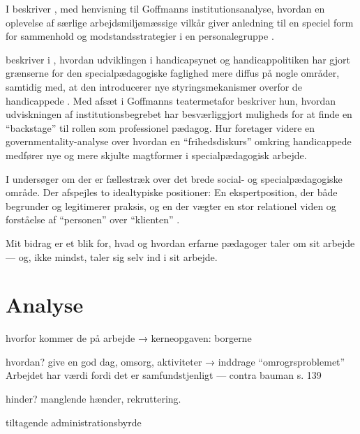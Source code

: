 I  beskriver \citeauthor{dreyerespersenBekymrendeIdentiteterAnbragte2010}, med henvisning til Goffmanns institutionsanalyse, hvordan en oplevelse af særlige arbejdsmiljømæssige vilkår giver anledning til en speciel form for sammenhold og modstandsstrategier i en personalegruppe \autocite{dreyerespersenBekymrendeIdentiteterAnbragte2010}.

\citeauthor{hurFrigorelsensMagt2015} beskriver i , hvordan udviklingen i handicapsynet og handicappolitiken har gjort grænserne for den specialpædagogiske faglighed mere diffus på nogle områder, samtidig med, at den introducerer nye styringsmekanismer overfor de handicappede \autocite{hurFrigorelsensMagt2015}.
Med afsæt i Goffmanns teatermetafor beskriver hun, hvordan udviskningen af institutionsbegrebet har besværliggjort muligheds for at finde en “backstage” til rollen som professionel pædagog.
Hur foretager videre en governmentality-analyse over hvordan en “frihedsdiskurs” omkring handicappede medfører nye og mere skjulte magtformer i specialpædagogisk arbejde.

I  undersøger \citeauthor{meyer-johansenFagligeOrienteringerSocialspecialpaedagogisk2018} om der er fællestræk over det brede social- og specialpædagogiske område.
Der afspejles to idealtypiske positioner: En ekspertposition, der både begrunder og legitimerer praksis, og en der vægter en stor relationel viden og forståelse af “personen” over “klienten” \autocite{meyer-johansenFagligeOrienteringerSocialspecialpaedagogisk2018}.

Mit bidrag er et blik for, hvad og hvordan erfarne pædagoger taler om sit arbejde — og, ikke mindst, taler sig selv ind i sit arbejde.

\section{Analyse}
hvorfor kommer de på arbejde → kerneopgaven: borgerne

hvordan? give en god dag, omsorg, aktiviteter → inddrage “omrogrsproblemet” \autocite[s.455ff]{hansbolKonstruktionAfProfessionel2008}
Arbejdet har værdi fordi det er samfundstjenligt — contra bauman s. 139

hinder? manglende hænder, rekruttering.

tiltagende administrationsbyrde \autocite[s. 16]{mik-meyerIndledningSkabeProfessionel2012}

